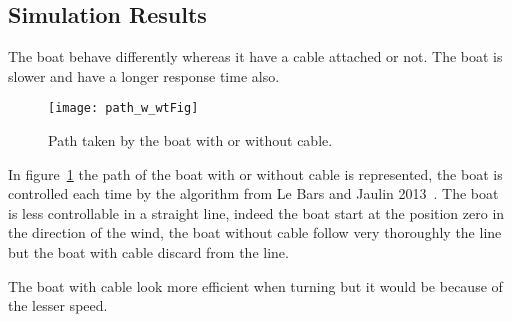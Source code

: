 \subsection{Simulation Results}

The boat behave differently whereas it have a cable attached or not. The boat is slower and have a longer response time also.

\begin{figure}[H]
\centering
    \texttt{[image: path\_w\_wtFig]}
    \caption{Path taken by the boat with or without cable.}
    \label{fig:pathBoat}
\end{figure}

In figure~\ref{fig:pathBoat} the path of the boat with or without cable is represented, the boat is controlled each time by the algorithm from Le Bars and Jaulin 2013~\cite{LeBars2013}. The boat is less controllable in a straight
line, indeed the boat start at the position zero in the direction of the wind, the boat without cable follow very thoroughly the line but the boat with cable discard from the line.

The boat with cable look more efficient when turning but it would be because of the lesser speed.

